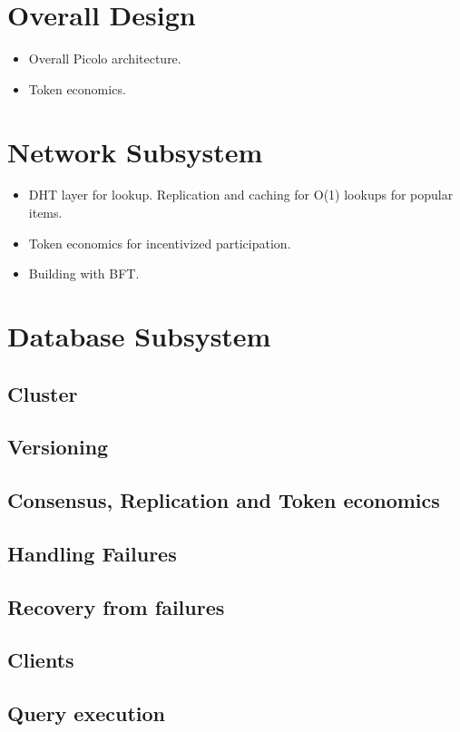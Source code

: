 \documentclass[preprint,12pt]{elsarticle}
\begin{document}
\section{Overall Design}

    \begin{itemize}
        \item Overall Picolo architecture.
        \item Token economics.
    \end{itemize}
\section{Network Subsystem}

    \begin{itemize}
        \item DHT layer for lookup. Replication and caching for O(1) lookups for popular items.
        \item Token economics for incentivized participation.
        \item Building with BFT. 
    \end{itemize}
\section{Database Subsystem}

\subsection{Cluster}
\subsection{Versioning}
\subsection{Consensus, Replication and Token economics}
\subsection{Handling Failures}
\subsection{Recovery from failures}
\subsection{Clients}
\subsection{Query execution}
\end{document}
